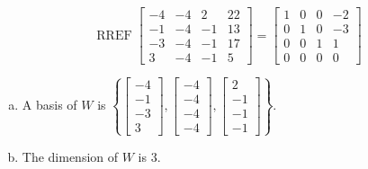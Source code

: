 \begin{exerciseAnswer} 


\[\operatorname{RREF} \left[\begin{array}{cccc}
-4 & -4 & 2 & 22 \\
-1 & -4 & -1 & 13 \\
-3 & -4 & -1 & 17 \\
3 & -4 & -1 & 5
\end{array}\right] = \left[\begin{array}{cccc}
1 & 0 & 0 & -2 \\
0 & 1 & 0 & -3 \\
0 & 0 & 1 & 1 \\
0 & 0 & 0 & 0
\end{array}\right] \]


\begin{enumerate}[(a)]
\item A basis of \(W\) is \( \left\{ \left[\begin{array}{c}
-4 \\
-1 \\
-3 \\
3
\end{array}\right] , \left[\begin{array}{c}
-4 \\
-4 \\
-4 \\
-4
\end{array}\right] , \left[\begin{array}{c}
2 \\
-1 \\
-1 \\
-1
\end{array}\right] \right\} \).
\item The dimension of \(W\) is \( 3 \).
\end{enumerate}
    
\end{exerciseAnswer}
    
